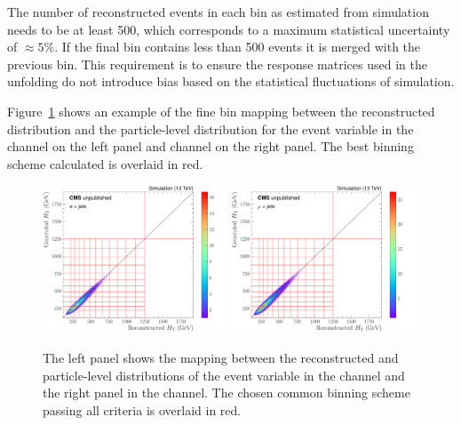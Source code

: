 The number of reconstructed \ttbar{} events in each bin as estimated from simulation needs to be at least 500, which corresponds to a maximum statistical uncertainty of $\approx5\%$.
If the final bin contains less than 500 events it is merged with the previous bin.
This requirement is to ensure the response matrices used in the unfolding do not introduce bias based on the statistical fluctuations of simulation.

Figure~\ref{fig:finebinHT} shows an example of the fine bin mapping between the reconstructed distribution and the particle-level distribution for the \HT{} event variable in the \eJets{} channel on the left panel and \muJets{} channel on the right panel.
The best binning scheme calculated is overlaid in red.
\begin{figure}[htpb]
	\centering
	\includegraphics[width=0.49\textwidth]{Figures/electron_HT_FineBinResponse.pdf}
	\includegraphics[width=0.49\textwidth]{Figures/muon_HT_FineBinResponse.pdf}
	\caption[The left panel shows the mapping between the reconstructed and particle-level distributions of the \HT{} event variable in the \eJets{} channel and the right panel in the \muJets{} channel. The chosen common binning scheme passing all criteria is overlaid in red.]{The left panel shows the mapping between the reconstructed and particle-level distributions of the \HT{} event variable in the \eJets{} channel and the right panel in the \muJets{} channel. The chosen common binning scheme passing all criteria is overlaid in red.}
	\label{fig:finebinHT}
\end{figure}

